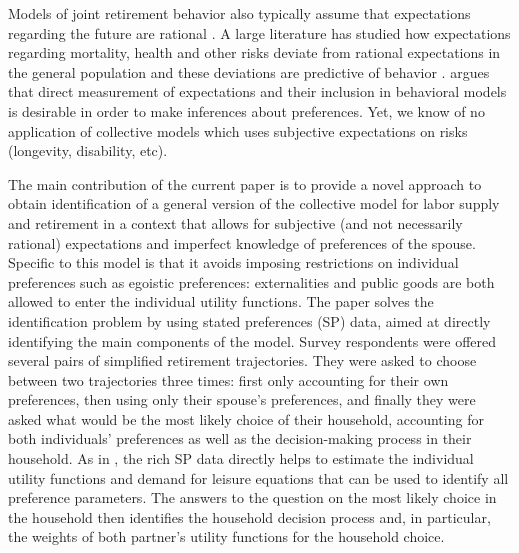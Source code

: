 \documentclass[11pt,letter]{article}
\begin{document}
\par Models of joint retirement behavior also typically assume that expectations regarding the future are rational \citep{blau1998,gustman2000retirement}. A large literature has studied how expectations regarding mortality, health and other risks deviate from rational expectations in the general population and these deviations are predictive of behavior \citep{hurd2009}. \citet{manski2004} argues that direct measurement of expectations and their inclusion in behavioral models is desirable in order to make inferences about preferences. Yet, we know of no application of collective models which uses subjective expectations on risks (longevity, disability, etc).

\par The main contribution of the current paper is to provide a novel approach to obtain identification of a general version of the collective model for labor supply and retirement in a context that allows for subjective (and not necessarily rational) expectations and imperfect knowledge of preferences of the spouse. Specific to this model is that it avoids imposing restrictions on individual preferences such as egoistic preferences: externalities and public goods are both allowed to enter the individual utility functions. The paper solves the identification problem by using stated preferences (SP) data, aimed at directly identifying the main components of the model. Survey respondents were offered several pairs of simplified retirement trajectories. They were asked to choose between two trajectories three times: first only accounting for their own preferences, then using only their spouse's preferences, and finally they were asked what would be the most likely choice of their household, accounting for both individuals' preferences as well as the decision-making process in their household. As in \cite{kapteyn1992}, the rich SP data directly helps to estimate the individual utility functions and demand for leisure equations that can be used to identify all preference parameters. The answers to the question on the most likely choice in the household then identifies the household decision process and, in particular, the weights of both partner's utility functions for the household choice.
\end{document}
